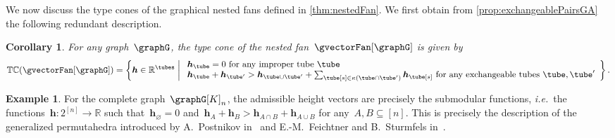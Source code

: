 \documentclass{amsart}
\newtheorem{corollary}[theorem]{Corollary}
\theoremstyle{definition}
\newtheorem{example}[theorem]{Example}
\newcommand{\R}{\mathbb{R}} %
\renewcommand{\b}[1]{{\boldsymbol{#1}}} %
\newcommand{\set}[2]{\left\{ #1 \;\middle|\; #2 \right\}} %
\newcommand{\ie}{\textit{i.e.}~} %
\newcommand{\typeCone}{\mathbb{TC}} %
\newcommand{\connectedComponents}{\kappa} %
\begin{document}
We now discuss the type cones of the graphical nested fans defined in \cref{thm:nestedFan}.
We first obtain from \cref{prop:exchangeablePairsGA} the following redundant description.

\begin{corollary}
\label{coro:typeConeGA}
For any graph~$\graphG$, the type cone of the nested fan~$\gvectorFan[\graphG]$ is given by
\[
\typeCone(\gvectorFan[\graphG]) = \set{\b{h} \in \R^{\tubes}}{\begin{array}{l} \b{h}_{\tube} = 0 \text{ for any improper tube } \tube \\ \b{h}_{\tube} + \b{h}_{\tube'} > \b{h}_{\tube \cup \tube'} + \sum_{\tube[s] \in \connectedComponents(\tube \cap \tube')} \b{h}_{\tube[s]} \text{ for any exchangeable tubes } \tube, \tube' \end{array}}.
\]
\end{corollary}

\begin{example}
For the complete graph~$\graphG[K]_n$, the admissible height vectors are precisely the submodular functions, \ie the functions~$\b{h} : 2^{[n]} \to \R$ such that~$\b{h}_{\varnothing} = 0$ and~$\b{h}_{A} + \b{h}_{B} > \b{h}_{A \cap B} + \b{h}_{A \cup B}$ for any~$A, B \subseteq [n]$.
This is precisely the description of the generalized permutahedra introduced by A.~Postnikov in~\cite{Postnikov} and E.-M.~Feichtner and B.~Sturmfels in~\cite{FeichtnerSturmfels}.
\end{example}
\end{document}
